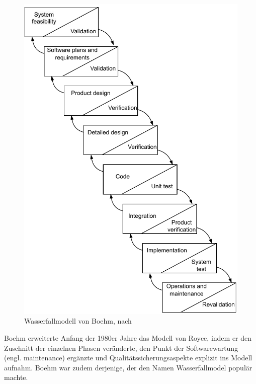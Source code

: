 \begin{figure}[h!]
    \centering
    \includegraphics[scale=0.75]{Bilder/Kapitel-2/WasserfallmodellBoehm.pdf}
    \vspace{\baselineskip} %
    \caption[Wasserfallmodell von Boehm]{Wasserfallmodell von Boehm, nach \cite[36]{boe81}}
    \label{fig:wasserfallmodel_nach_boehm}
\end{figure}

\pagebreak %

Boehm erweiterte Anfang der 1980er Jahre das Modell von Royce, indem er den Zuschnitt der einzelnen Phasen veränderte, den Punkt der Softwarewartung (engl. maintenance) ergänzte und Qualitätssicherungsaspekte explizit ins Modell aufnahm. Boehm war zudem derjenige, der den Namen Wasserfallmodel populär machte.

